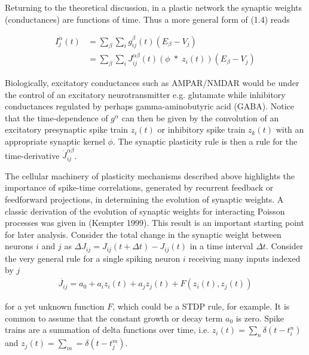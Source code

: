 \documentclass{ucetd}
\begin{document}
Returning to the theoretical discussion, in a plastic network the synaptic weights (conductances) are functions of time. Thus a more general form of (1.4) reads

\begin{align*}
I_{j}^{\alpha}(t) &= \sum_{\beta}\sum_{i} g_{ij}^{\beta}(t)(E_{\beta} - V_{j})\\
&= \sum_{\beta}\sum_{i}J_{ij}^{\alpha\beta}(t)\left(\phi\;*\;z_{i}(t)\right)(E_{\beta} - V_{j})
\end{align*}

Biologically, excitatory conductances such as AMPAR/NMDAR would be under the control of an excitatory neurotransmitter e.g. glutamate while inhibitory conductances regulated by perhaps gamma-aminobutyric acid (GABA). Notice that the time-dependence of $g^{\alpha}$ can then be given by the convolution of an excitatory presynaptic spike train $z_{i}(t)$ or inhibitory spike train $z_{k}(t)$ with an appropriate synaptic kernel $\phi$. The synaptic plasticity rule is then a rule for the time-derivative $\dot{J}^{\alpha\beta}_{ij}$.


The cellular machinery of plasticity mechanisms described above highlights the importance of spike-time correlations, generated by recurrent feedback or feedforward projections, in determining the evolution of synaptic weights. A classic derivation of the evolution of synaptic weights for interacting Poisson processes was given in (Kempter 1999). This result is an important starting point for later analysis. Consider the total change in the synaptic weight between neurons $i$ and $j$ as $\Delta J_{ij} = J_{ij}(t+\Delta t) - J_{ij}(t)$ in a time interval $\Delta t$. Consider the very general rule for a single spiking neuron $i$ receiving many inputs indexed by $j$
\begin{align*}
\dot{J_{ij}} = a_{0} + a_{i}z_{i}(t) + a_{j}z_{j}(t) + F(z_{i}(t),z_{j}(t))
\end{align*}


for a yet unknown function $F$, which could be a STDP rule, for example. It is common to assume that the constant growth or decay term $a_{0}$ is zero. Spike trains are a summation of delta functions over time, i.e. $z_{i}(t) = \sum_{n} \delta(t-t_{i}^{n})$ and $z_{j}(t) = \sum_{m} = \delta(t-t_{j}^{m})$. 
\end{document}
